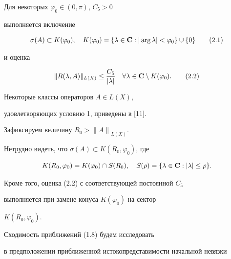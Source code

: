 \begin{cond}


Для некоторых $\varphi_0 \in (0, \pi)$, $C_5>0$


выполняется включение


\begin{equation}


\sigma(A) \subset K(\varphi_0), \quad


K(\varphi_0)=\{ \lambda \in {\bold C} : | \arg


\lambda | < \varphi_0 \} \cup \{ 0 \}


\tag{2.1}


\end{equation}


и оценка


\begin{equation}


\| R(\lambda,A)\|_{ L(X)} \leq \frac{C_5}{| \lambda |}


\quad \forall \lambda \in {\bold C} \setminus K(\varphi_0).


\tag{2.2}


\end{equation}


\end{cond}





Некоторые классы операторов $A \in L(X)$,


удовлетворяющих условию 1, приведены в [11].


Зафиксируем величину $R_0 > {\| A\|}_{ L(X)}$.


Нетрудно видеть, что $\sigma(A) \subset K(R_0,\varphi_0)$, где


$$


K(R_0,\varphi_0)= K(\varphi_0) \cap S(R_0), \quad S(\rho)=\{ \lambda \in


{\bold C} : | \lambda | \leq \rho \}.


$$


Кроме того, оценка (2.2) с соответствующей постоянной $C_5$


выполняется при замене конуса $K(\varphi_0)$ на сектор


$K(R_0,\varphi_0)$.





Сходимость приближений (1.8) будем исследовать


в предположении приближенной истокопредставимости начальной невязки


